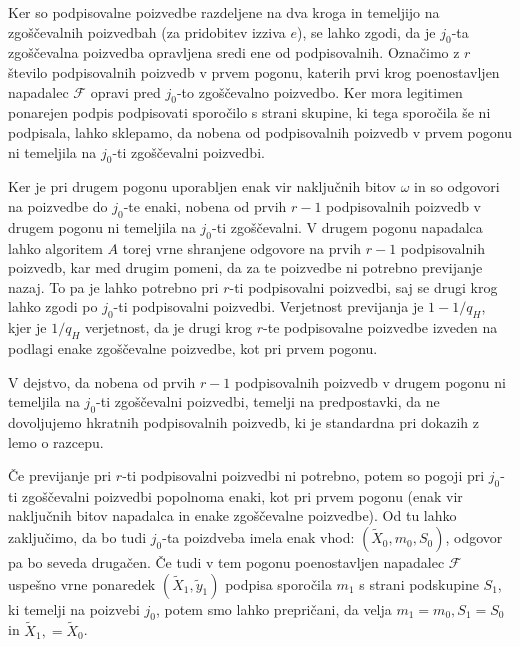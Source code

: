 \begin{dokaz}
Ker so podpisovalne poizvedbe razdeljene na dva kroga in temeljijo na zgoščevalnih poizvedbah (za
pridobitev izziva $e$), se lahko zgodi, da je $j_0$-ta zgoščevalna poizvedba opravljena sredi ene
od podpisovalnih. Označimo z $r$ število podpisovalnih poizvedb v prvem pogonu, katerih prvi krog
poenostavljen napadalec $\mathcal{F}$ opravi pred $j_0$-to zgoščevalno poizvedbo. Ker mora legitimen
ponarejen podpis podpisovati sporočilo s strani skupine, ki tega sporočila še ni podpisala, lahko
sklepamo, da nobena od podpisovalnih poizvedb v prvem pogonu ni temeljila na $j_0$-ti zgoščevalni
poizvedbi.

Ker je pri drugem pogonu uporabljen enak vir naključnih bitov $\omega$ in so odgovori na poizvedbe do
$j_0$-te enaki, nobena od prvih $r - 1$ podpisovalnih poizvedb v drugem pogonu ni temeljila na $j_0$-ti
zgoščevalni. V drugem pogonu napadalca lahko algoritem $A$ torej vrne shranjene odgovore na prvih
$r - 1$ podpisovalnih poizvedb, kar med drugim pomeni, da za te poizvedbe ni potrebno previjanje
nazaj. To pa je lahko potrebno pri $r$-ti podpisovalni poizvedbi, saj se drugi krog lahko zgodi po
$j_0$-ti podpisovalni poizvedbi. Verjetnost previjanja je $1 - 1/q_H$, kjer je $1/q_H$ verjetnost,
da je drugi krog $r$-te podpisovalne poizvedbe izveden na podlagi enake zgoščevalne poizvedbe, kot
pri prvem pogonu.

\begin{opomba}
    V dejstvo, da nobena od prvih $r - 1$ podpisovalnih poizvedb v drugem pogonu ni temeljila na
    $j_0$-ti zgoščevalni poizvedbi, temelji na predpostavki, da ne dovoljujemo hkratnih podpisovalnih
    poizvedb, ki je standardna pri dokazih z lemo o razcepu.
\end{opomba}

Če previjanje pri $r$-ti podpisovalni poizvedbi ni potrebno, potem so pogoji pri $j_0$-ti zgoščevalni
poizvedbi popolnoma enaki, kot pri prvem pogonu (enak vir naključnih bitov napadalca in enake
zgoščevalne poizvedbe). Od tu lahko zaključimo, da bo tudi $j_0$-ta poizdveba imela enak vhod:
$(\tilde{X}_0, m_0, S_0)$, odgovor pa bo seveda drugačen. Če tudi v tem pogonu poenostavljen napadalec
$\mathcal{F}$ uspešno vrne ponaredek $(\tilde{X}_1, \tilde{y}_1)$ podpisa sporočila $m_1$ s strani
podskupine $S_1$, ki temelji na poizvebi $j_0$, potem smo lahko prepričani, da velja $m_1 = m_0,
S_1 = S_0$ in $\tilde{X}_1, = \tilde{X}_0$.


\end{dokaz}
